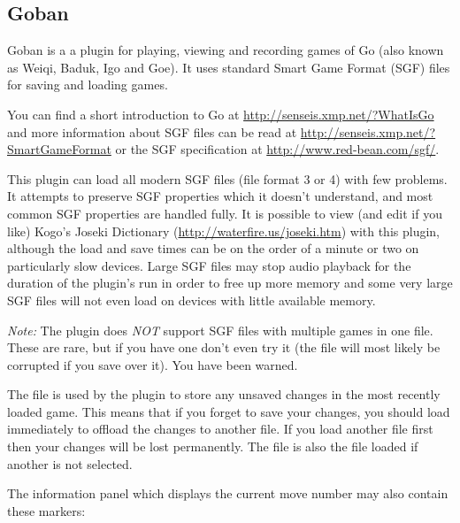 \subsection{Goban}
Goban is a a plugin for playing, viewing and recording games of Go (also known
as Weiqi, Baduk, Igo and Goe).  It uses standard Smart Game Format (SGF) files
for saving and loading games.

You can find a short introduction to Go at
\url{http://senseis.xmp.net/?WhatIsGo} and more information about SGF files
can be read at \url{http://senseis.xmp.net/?SmartGameFormat} or the SGF
specification at
\url{http://www.red-bean.com/sgf/}.

This plugin can load all modern SGF files (file format 3 or 4) with few problems.
It attempts to preserve SGF properties which it doesn't understand, and most common
SGF properties are handled fully.  It is possible to view (and edit if you like)
Kogo's Joseki Dictionary (\url{http://waterfire.us/joseki.htm}) with this plugin,
although the load and save times can be on the order of a minute or two on
particularly slow devices.  Large SGF files may stop audio playback for the duration
of the plugin's run in order to free up more memory and some very large SGF files will
not even load on devices with little available memory.

\emph{Note: } The plugin does \emph{NOT} support SGF files with multiple games in
one file.  These are rare, but if you have one don't even try it (the file will most
likely be corrupted if you save over it).  You have been warned.

The file  is used by the plugin to store any unsaved
changes in the most recently loaded game.  This means that if you forget to save your
changes, you should load  immediately to offload the changes
to another file.  If you load another file first then your changes will be lost
permanently.  The  file is also the file loaded if another
is not selected.

The information panel which displays the current move number may also contain
these markers: \\

